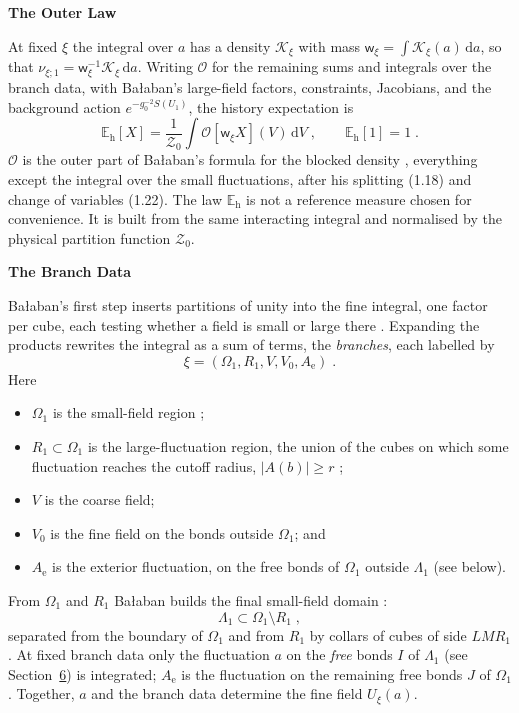 \documentclass[11pt,a4paper]{article}
\newcommand{\dd}{\mathrm{d}}
\newcommand{\Eh}{\mathbb E_{\mathrm h}}
\newcommand{\subhead}[1]{\par\vspace{4pt}\textbf{\color{ink}#1}\par}
\begin{document}
\subhead{The Outer Law}
At fixed $\xi$ the integral over $a$ has a density $\mathcal K_\xi$ with mass $\mathsf w_\xi=\int\mathcal K_\xi(a)\,\dd a$, so that $\nu_{\xi;1}=\mathsf w_\xi^{-1}\mathcal K_\xi\,\dd a$. Writing $\mathcal O$ for the remaining sums and integrals over the branch data, with Ba{\l}aban's large-field factors, constraints, Jacobians, and the background action $e^{-g_0^{-2}S(U_1)}$, the history expectation is
\begin{equation*}
    \Eh[X]=\frac{1}{\mathcal Z_0}\int\mathcal O[\mathsf w_\xi X](V)\,\dd V\;,\qquad \Eh[1]=1\;.
\end{equation*}
$\mathcal O$ is the outer part of Ba{\l}aban's formula for the blocked density \cite[eq.~(1.15)]{BalabanCRE}, everything except the integral over the small fluctuations, after his splitting (1.18) and change of variables (1.22). The law $\Eh$ is not a reference measure chosen for convenience. It is built from the same interacting integral and normalised by the physical partition function $\mathcal Z_0$.

\subhead{The Branch Data}
Ba{\l}aban's first step inserts partitions of unity into the fine integral, one factor per cube, each testing whether a field is small or large there \cite[pp.~245--251]{BalabanCRE}. Expanding the products rewrites the integral as a sum of terms, the \emph{branches}, each labelled by
\begin{equation*}
    \xi=(\Omega_1,R_1,V,V_0,A_{\mathrm e})\;.
\end{equation*}
Here
\begin{itemize}
    \item $\Omega_1$ is the small-field region \cite[eq.~(1.10)]{BalabanCRE};
    \item $R_1\subset\Omega_1$ is the large-fluctuation region, the union of the cubes on which some fluctuation reaches the cutoff radius, $|A(b)|\geqslant r$ \cite[eq.~(1.18)]{BalabanCRE};
    \item $V$ is the coarse field;
    \item $V_0$ is the fine field on the bonds outside $\Omega_1$; and
    \item $A_{\mathrm e}$ is the exterior fluctuation, on the free bonds of $\Omega_1$ outside $\Lambda_1$ (see below).
\end{itemize}
From $\Omega_1$ and $R_1$ Ba{\l}aban builds the final small-field domain \cite[eq.~(1.20)]{BalabanCRE}:
\begin{equation*}
    \Lambda_1\subset\Omega_1\setminus R_1\;,
\end{equation*}
separated from the boundary of $\Omega_1$ and from $R_1$ by collars of cubes of side $LMR_1$. At fixed branch data only the fluctuation $a$ on the \emph{free} bonds $I$ of $\Lambda_1$ (see Section~\hyperref[summary:6]{6}) is integrated; $A_{\mathrm e}$ is the fluctuation on the remaining free bonds $J$ of $\Omega_1$. Together, $a$ and the branch data determine the fine field $U_\xi(a)$.
\end{document}
